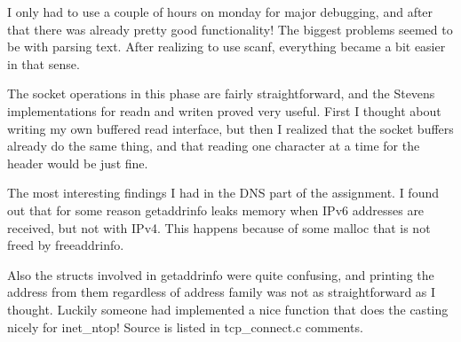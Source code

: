 \documentclass[a4paper,12pt]{article}
\begin{document}
I only had to use a couple of hours on monday for major debugging, and after that there was already pretty good functionality! The biggest problems seemed to be with parsing text. After realizing to use scanf, everything became a bit easier in that sense.

The socket operations in this phase are fairly straightforward, and the Stevens implementations for readn and writen proved very useful. First I thought about writing my own buffered read interface, but then I realized that the socket buffers already do the same thing, and that reading one character at a time for the header would be just fine.

The most interesting findings I had in the DNS part of the assignment. I found out that for some reason getaddrinfo leaks memory when IPv6 addresses are received, but not with IPv4. This happens because of some malloc that is not freed by freeaddrinfo.

Also the structs involved in getaddrinfo were quite confusing, and printing the address from them regardless of address family was not as straightforward as I thought. Luckily someone had implemented a nice function that does the casting nicely for inet\_ntop! Source is listed in tcp\_connect.c comments.
\end{document}
